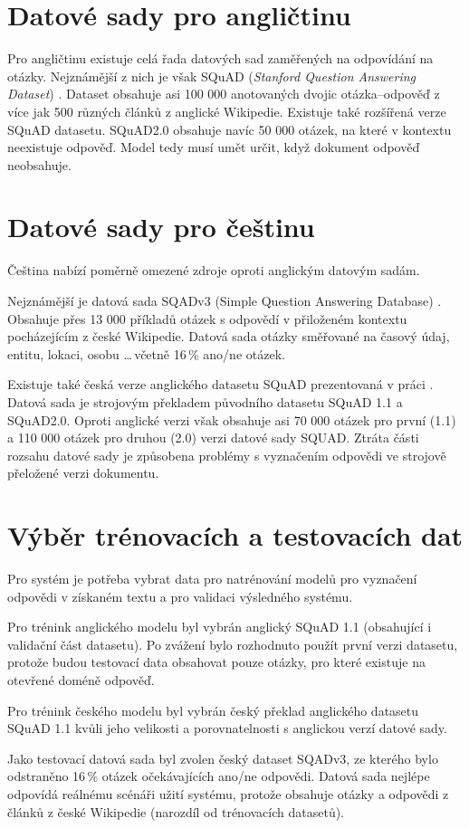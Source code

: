 \section{Datové sady pro angličtinu}
Pro angličtinu existuje celá řada datových sad zaměřených na odpovídání na otázky. Nejznámější z nich je však SQuAD (\emph{Stanford Question Answering Dataset}) \cite{squad}. Dataset obsahuje asi 100 000 anotovaných dvojic otázka--odpověď z více jak 500 různých článků z anglické Wikipedie. Existuje také rozšířená verze SQuAD datasetu. SQuAD2.0 \cite{squad_v2} obsahuje navíc 50 000 otázek, na které v kontextu neexistuje odpověď. Model tedy musí umět určit, když dokument odpověď neobsahuje.

\section{Datové sady pro češtinu}
Čeština nabízí poměrně omezené zdroje oproti anglickým datovým sadám.\par 
Nejznámější je datová sada SQADv3 (Simple Question Answering Database) \cite{sqad}. Obsahuje přes 13 000 příkladů otázek s odpovědí v přiloženém kontextu pocházejícím z české Wikipedie. Datová sada otázky směřované na časový údaj, entitu, lokaci, osobu \dots \,včetně 16\,\% ano/ne otázek.\par
Existuje také česká verze anglického datasetu SQuAD prezentovaná v práci \cite{czech_squad}. Datová sada je strojovým překladem původního datasetu SQuAD 1.1 a SQuAD2.0. Oproti anglické verzi však obsahuje asi 70 000 otázek pro první (1.1) a 110 000 otázek pro druhou (2.0) verzi datové sady SQUAD. Ztráta části rozsahu datové sady je způsobena problémy s vyznačením odpovědi ve strojově přeložené verzi dokumentu.

\section{Výběr trénovacích a testovacích dat}
\label{dataset_choice}
Pro systém je potřeba vybrat data pro natrénování modelů pro vyznačení odpovědi v získaném textu a pro validaci výsledného systému.\par
Pro trénink anglického modelu byl vybrán anglický SQuAD 1.1 (obsahující i validační část datasetu). Po zvážení bylo rozhodnuto použít první verzi datasetu, protože budou testovací data obsahovat pouze otázky, pro které existuje na otevřené doméně odpověď.\par
Pro trénink českého modelu byl vybrán český překlad anglického datasetu SQuAD 1.1 \cite{czech_squad} kvůli jeho velikosti a porovnatelnosti s anglickou verzí datové sady.\par
\medskip
Jako testovací datová sada byl zvolen český dataset SQADv3, ze kterého bylo odstraněno 16\,\% otázek očekávajících ano/ne odpovědi. Datová sada nejlépe odpovídá reálnému scénáři užití systému, protože obsahuje otázky a odpovědi z článků z české Wikipedie (narozdíl od trénovacích datasetů).


